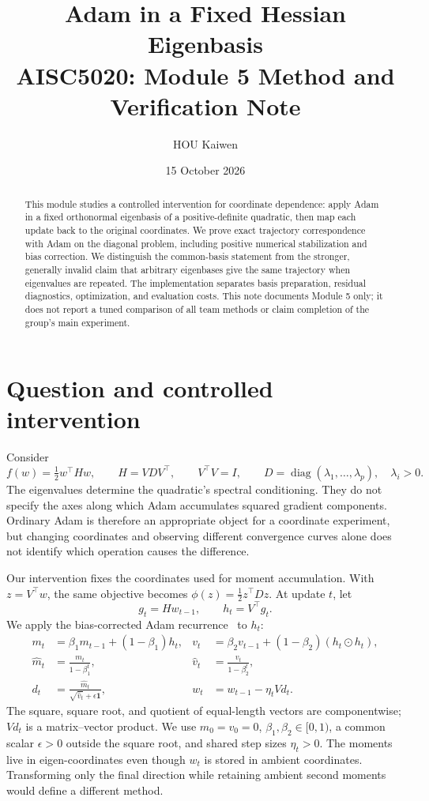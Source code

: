 \documentclass[11pt,a4paper]{article}
\title{Adam in a Fixed Hessian Eigenbasis\\[0.35em]
\large AISC5020: Module 5 Method and Verification Note}
\author{HOU Kaiwen}
\date{15 October 2026}
\newcommand{\diag}{\operatorname{diag}}
\begin{document}
\maketitle
\begin{abstract}
This module studies a controlled intervention for coordinate dependence: apply
Adam in a fixed orthonormal eigenbasis of a positive-definite quadratic, then
map each update back to the original coordinates. We prove exact trajectory
correspondence with Adam on the diagonal problem, including positive numerical
stabilization and bias correction. We distinguish the common-basis statement
from the stronger, generally invalid claim that arbitrary eigenbases give the
same trajectory when eigenvalues are repeated. The implementation separates
basis preparation, residual diagnostics, optimization, and evaluation costs.
This note documents Module 5 only; it does not report a tuned comparison of all
team methods or claim completion of the group's main experiment.
\end{abstract}

\section{Question and controlled intervention}
Consider
\begin{equation}
 f(w)=\tfrac12 w^\top H w,\qquad
 H=VDV^\top,\qquad V^\top V=I,\qquad
 D=\diag(\lambda_1,\ldots,\lambda_p),\quad \lambda_i>0.
 \label{eq:problem}
\end{equation}
The eigenvalues determine the quadratic's spectral conditioning. They do not
specify the axes along which Adam accumulates squared gradient components.
Ordinary Adam is therefore an appropriate object for a coordinate experiment,
but changing coordinates and observing different convergence curves alone does
not identify which operation causes the difference.

Our intervention fixes the coordinates used for moment accumulation. With
$z=V^\top w$, the same objective becomes $\phi(z)=\tfrac12 z^\top Dz$.
At update $t$, let
\begin{equation}
 g_t=Hw_{t-1},\qquad h_t=V^\top g_t.
 \label{eq:gradient}
\end{equation}
We apply the bias-corrected Adam recurrence~\cite{adam} to $h_t$:
\begin{align}
 m_t&=\beta_1m_{t-1}+(1-\beta_1)h_t,
 &v_t&=\beta_2v_{t-1}+(1-\beta_2)(h_t\odot h_t),\label{eq:moments}\\
 \widehat m_t&=\frac{m_t}{1-\beta_1^t},
 &\widehat v_t&=\frac{v_t}{1-\beta_2^t},\label{eq:correction}\\
 d_t&=\frac{\widehat m_t}{\sqrt{\widehat v_t}+\epsilon\mathbf1},
 &w_t&=w_{t-1}-\eta_tVd_t.\label{eq:update}
\end{align}
The square, square root, and quotient of equal-length vectors are
componentwise; $Vd_t$ is a matrix--vector product. We use $m_0=v_0=0$,
$\beta_1,\beta_2\in[0,1)$, a common scalar
$\epsilon>0$ outside the square root, and shared step sizes $\eta_t>0$.
The moments live in eigen-coordinates even though $w_t$ is stored in ambient
coordinates. Transforming only the final direction while retaining ambient
second moments would define a different method.
\end{document}
